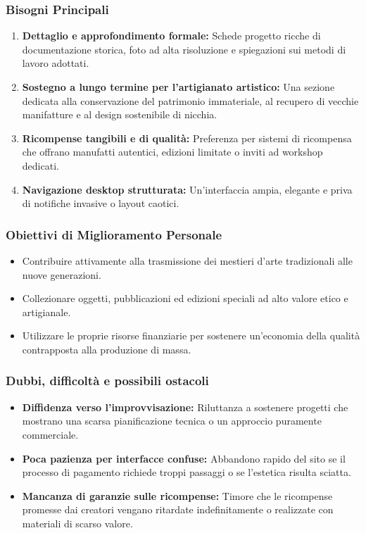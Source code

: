 \documentclass[11pt,a4paper]{article}
\begin{document}
\subsubsection{Bisogni Principali}
\begin{enumerate}
    \item \textbf{Dettaglio e approfondimento formale:} Schede progetto ricche di documentazione storica, foto ad alta risoluzione e spiegazioni sui metodi di lavoro adottati.
    \item \textbf{Sostegno a lungo termine per l'artigianato artistico:} Una sezione dedicata alla conservazione del patrimonio immateriale, al recupero di vecchie manifatture e al design sostenibile di nicchia.
    \item \textbf{Ricompense tangibili e di qualità:} Preferenza per sistemi di ricompensa che offrano manufatti autentici, edizioni limitate o inviti ad workshop dedicati.
    \item \textbf{Navigazione desktop strutturata:} Un'interfaccia ampia, elegante e priva di notifiche invasive o layout caotici.
\end{enumerate}

\subsubsection{Obiettivi di Miglioramento Personale}
\begin{itemize}
    \item Contribuire attivamente alla trasmissione dei mestieri d'arte tradizionali alle nuove generazioni.
    \item Collezionare oggetti, pubblicazioni ed edizioni speciali ad alto valore etico e artigianale.
    \item Utilizzare le proprie risorse finanziarie per sostenere un'economia della qualità contrapposta alla produzione di massa.
\end{itemize}

\subsubsection{Dubbi, difficoltà e possibili ostacoli}
\begin{itemize}
    \item \textbf{Diffidenza verso l'improvvisazione:} Riluttanza a sostenere progetti che mostrano una scarsa pianificazione tecnica o un approccio puramente commerciale.
    \item \textbf{Poca pazienza per interfacce confuse:} Abbandono rapido del sito se il processo di pagamento richiede troppi passaggi o se l'estetica risulta sciatta.
    \item \textbf{Mancanza di garanzie sulle ricompense:} Timore che le ricompense promesse dai creatori vengano ritardate indefinitamente o realizzate con materiali di scarso valore.
\end{itemize}
\end{document}
